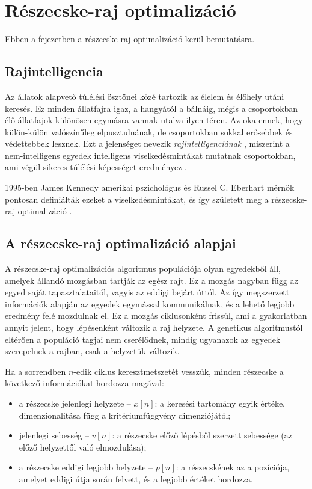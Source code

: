 \chapter{Részecske-raj optimalizáció}

Ebben a fejezetben a részecske-raj optimalizáció kerül bemutatásra.

\section{Rajintelligencia}

Az állatok alapvető túlélési ösztönei közé tartozik az élelem és élőhely utáni keresés. Ez minden állatfajra igaz, a hangyától a bálnáig, mégis a csoportokban élő állatfajok különösen egymásra vannak utalva ilyen téren. Az oka ennek, hogy külön-külön valószínűleg elpusztulnának, de csoportokban sokkal erősebbek és védettebbek lesznek. Ezt a jelenséget nevezik \textit{rajintelligenciának} , miszerint a nem-intelligens egyedek intelligens viselkedésmintákat mutatnak csoportokban, ami végül sikeres túlélési képességet eredményez \parencite{rapaic2019}.

1995-ben James Kennedy amerikai pszichológus és Russel C. Eberhart mérnök pontosan definiálták ezeket a viselkedésmintákat, és így született meg a részecske-raj optimalizáció \parencite{dorigo2007}.

\section{A részecske-raj optimalizáció alapjai}

A részecske-raj optimalizációs algoritmus  populációja olyan egyedekből áll, amelyek állandó mozgásban tartják az egész rajt. Ez a mozgás nagyban függ az egyed saját tapasztalataitól, vagyis az eddigi bejárt úttól. Az így megszerzett információk alapján az egyedek egymással kommunikálnak, és a lehető legjobb eredmény felé mozdulnak el. Ez a mozgás ciklusonként frissül, ami a gyakorlatban annyit jelent, hogy lépésenként változik a raj helyzete. A genetikus algoritmustól eltérően a populáció tagjai nem cserélődnek, mindig ugyanazok az egyedek szerepelnek a rajban, csak a helyzetük változik.

Ha a sorrendben $n$-edik ciklus keresztmetszetét vesszük, minden részecske a következő információkat hordozza magával:

\begin{itemize}
    \item a részecske jelenlegi helyzete -- $x[n]$:
a keresési tartomány egyik értéke, dimenzionalitása függ a kritériumfüggvény dimenziójától;
	\item jelenlegi sebesség -- $v[n]$:
a részecske előző lépésből szerzett sebessége (az előző helyzettől való elmozdulása);
	\item a részecske eddigi legjobb helyzete -- $p[n]$:
a részecskének az a pozíciója, amelyet eddigi útja során felvett, és a legjobb értéket hordozza.
\end{itemize}

